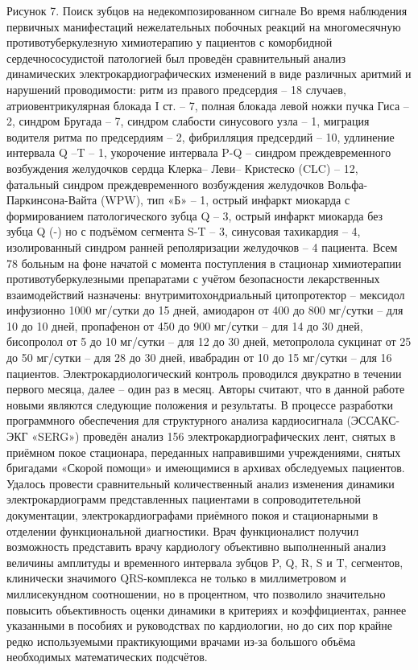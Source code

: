 \documentclass[runningheads]{AIIT}
\begin{document}
Рисунок 7. Поиск зубцов на недекомпозированном сигнале
 Во время  наблюдения  первичных манифестаций нежелательных побочных реакций на многомесячную противотуберкулезную химиотерапию у пациентов с коморбидной сердечнососудистой патологией был проведён сравнительный анализ динамических электрокардиографических изменений в виде различных аритмий и нарушений проводимости: ритм из правого предсердия – 18 случаев, атриовентрикулярная блокада I ст. – 7, полная блокада левой ножки пучка Гиса – 2, синдром Бругада – 7, синдром слабости синусового узла – 1, миграция водителя ритма по предсердиям – 2, фибрилляция предсердий – 10, удлинение интервала Q –T – 1, укорочение интервала P-Q – синдром  преждевременного возбуждения желудочков сердца Клерка– Леви– Кристеско (CLC) – 12, фатальный синдром  преждевременного возбуждения желудочков  Вольфа-Паркинсона-Вайта (WPW), тип «Б» – 1, острый инфаркт миокарда с формированием патологического зубца Q – 3, острый инфаркт миокарда без зубца Q (-) но с подъёмом сегмента S-T – 3, синусовая тахикардия – 4, изолированный синдром ранней реполяризации желудочков  – 4 пациента.
Всем 78 больным на фоне начатой с момента поступления в стационар химиотерапии противотуберкулезными препаратами с учётом безопасности лекарственных взаимодействий назначены: внутримитохондриальный цитопротектор – мексидол инфузионно 1000 мг/сутки до 15 дней, амиодарон от 400 до 800 мг/сутки – для 10 до 10 дней, пропафенон от 450 до 900 мг/сутки – для 14 до 30 дней, бисопролол от 5 до 10 мг/сутки – для 12 до 30 дней, метопролола сукцинат от 25 до 50 мг/сутки  – для 28 до 30 дней, ивабрадин от 10 до 15 мг/сутки – для 16 пациентов. Электрокардиологический контроль проводился двукратно в течении первого месяца, далее – один раз в месяц.
Авторы считают, что в данной работе новыми являются следующие положения и результаты.
В процессе разработки программного обеспечения для структурного анализа кардиосигнала (ЭССАКС-ЭКГ «SERG») проведён анализ 156 электрокардиографических лент, снятых в приёмном покое стационара, переданных направившими учреждениями, снятых бригадами «Скорой помощи» и имеющимися в архивах обследуемых пациентов.
Удалось провести сравнительный количественный анализ изменения динамики электрокардиограмм представленных пациентами в сопроводитетельной документации, электрокардиографами приёмного покоя и стационарными в отделении функциональной диагностики.
Врач функционалист получил возможность представить врачу кардиологу объективно выполненный анализ величины амплитуды и временного интервала  зубцов P, Q, R, S и T, сегментов, клинически значимого QRS-комплекса не только в миллиметровом и миллисекундном соотношении, но в процентном, что позволило значительно повысить объективность оценки динамики в критериях и коэффициентах, раннее указанными в  пособиях и руководствах по кардиологии, но до сих пор крайне редко используемыми практикующими врачами из-за большого объёма необходимых математических подсчётов.
\end{document}
